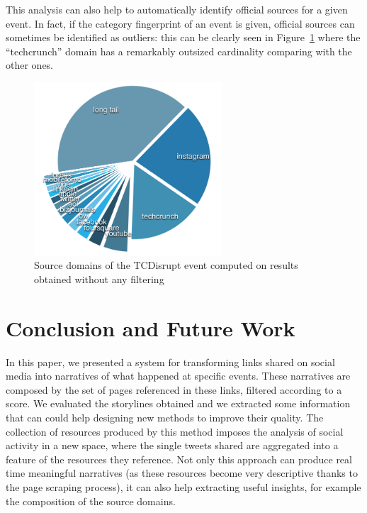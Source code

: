 \documentclass{sig-alternate}
\begin{document}
This analysis can also help to automatically identify official sources for a given event. In fact, if the category fingerprint of an event is given, official sources can sometimes be identified as outliers: this can be clearly seen in Figure~\ref{fig:tcdisrupt_outlier} where the ``techcrunch'' domain has a remarkably outsized cardinality comparing with the other ones.
\begin{figure}[htbp]
  \centering
  \includegraphics[width=7cm]{Figures/tcdisrupt_outlier.png}
  \caption{Source domains of the TCDisrupt event computed on results obtained without any filtering}
  \label{fig:tcdisrupt_outlier}
\end{figure}


\section{Conclusion and Future Work}
\label{sec:conclusions}
In this paper, we presented a system for transforming links shared on social media into narratives of what happened at specific events. These narratives are composed by the set of pages referenced in these links, filtered according to a score. We evaluated the storylines obtained and we extracted some information that can could help designing new methods to improve their quality. The collection of resources produced by this method imposes the analysis of social activity in a new space, where the single tweets shared are aggregated into a feature of the resources they reference. Not only this approach can produce real time meaningful narratives (as these resources become very descriptive thanks to the page scraping process), it can also help extracting useful insights, for example the composition of the source domains.
\end{document}
